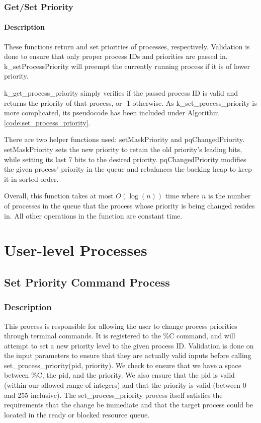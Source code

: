\documentclass[12pt]{report}
\begin{document}
\section{Get/Set Priority}

\subsection{Description}
    These functions return and set priorities of processes, respectively.
    Validation is done to ensure that only proper process IDs and priorities are
    passed in.  k\_setProcessPriority will preempt the currently running process
    if it is of lower priority.

    k\_get\_process\_priority simply verifies if the passed process ID is valid
    and returns the priority of that process, or -1 otherwise.  As
    k\_set\_process\_priority is more complicated, its pseudocode has been
    included under Algorithm \ref{code:set_process_priority}.

    There are two helper functions used: setMaskPriority and pqChangedPriority.
    setMaskPriority sets the new priority to retain the old priority's leading
    bits, while setting its last 7 bits to the desired priority.
    pqChangedPriority modifies the given process' priority in the queue and
    rebalances the backing heap to keep it in sorted order.

    Overall, this function takes at most $O(\log(n))$ time where $n$ is the
    number of processes in the queue that the process whose priority is being
    changed resides in.  All other operations in the function are constant time.

\part{User-level Processes}

\chapter{Set Priority Command Process}

\section{Description}
    This process is responsible for allowing the user to change process
    priorities through terminal commands.  It is registered to the \%C command,
    and will attempt to set a new priority level to the given process ID.
    Validation is done on the input parameters to ensure that they are actually
    valid inputs before calling set\_process\_priority(pid, priority).  We check
    to ensure that we have a space between \%C, the pid, and the priority.  We
    also ensure that the pid is valid (within our allowed range of integers) and
    that the priority is valid (between 0 and 255 inclusive).  The
    set\_process\_priority process itself satisfies the requirements that the
    change be immediate and that the target process could be located in the
    ready or blocked resource queue.
\end{document}
